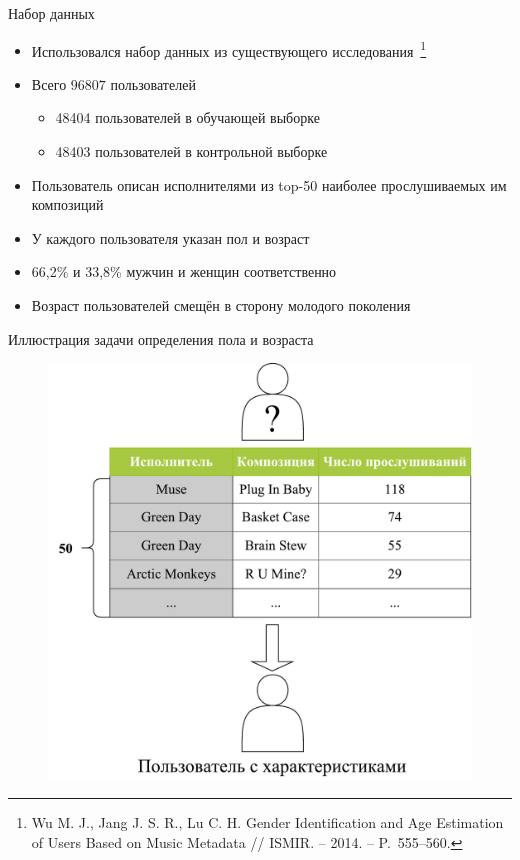\documentclass{beamer}
\begin{document}
\begin{frame}{Набор данных}
    \begin{itemize}
        \item {Использовался набор данных из существующего 
              исследования~\footnote{Wu M. J.,
              Jang J. S. R., Lu C. H. Gender Identification
              and Age Estimation of Users Based on Music 
              Metadata // ISMIR. – 2014. – P.~555--560.}}
        \item {Всего $96807$ пользователей}
            \begin{itemize}
                \item {48404 пользователей в обучающей выборке}
                \item {48403 пользователей в контрольной выборке}
            \end{itemize}
        \item {Пользователь описан исполнителями из top-50 наиболее
            прослушиваемых им композиций}
        \item {У каждого пользователя указан пол и возраст}
        \item {66{,}2\% и 33{,}8\% мужчин и женщин соответственно}
        \item {Возраст пользователей смещён в сторону молодого поколения}
    \end{itemize}
\end{frame}

\begin{frame}{Иллюстрация задачи определения пола и возраста}
    \begin{figure}
        \includegraphics[scale=0.45]{figures/lastfm-top.pdf}
    \end{figure}
\end{frame}
\end{document}
